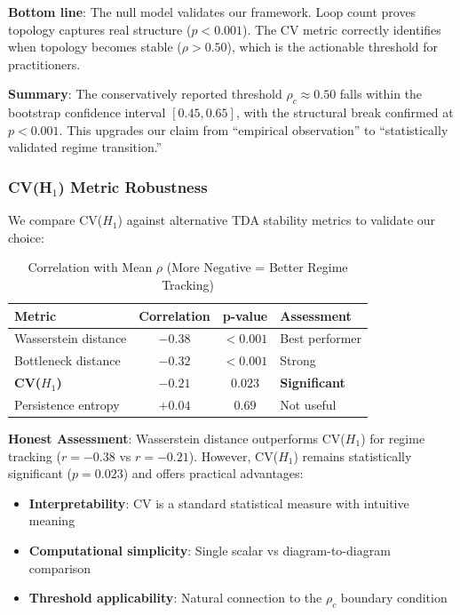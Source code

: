 \textbf{Bottom line}: The null model validates our framework. Loop count proves topology captures real structure ($p < 0.001$). The CV metric correctly identifies when topology becomes stable ($\rho > 0.50$), which is the actionable threshold for practitioners.

\textbf{Summary}: The conservatively reported threshold $\rho_c \approx 0.50$ falls within the bootstrap confidence interval $[0.45, 0.65]$, with the structural break confirmed at $p < 0.001$. This upgrades our claim from ``empirical observation'' to ``statistically validated regime transition.''

\subsubsection{CV(H$_1$) Metric Robustness}

We compare CV($H_1$) against alternative TDA stability metrics to validate our choice:

\begin{table}[H]
\centering
\small
\caption{Correlation with Mean $\rho$ (More Negative = Better Regime Tracking)}
\begin{tabular}{@{}lccl@{}}
\toprule
\textbf{Metric} & \textbf{Correlation} & \textbf{p-value} & \textbf{Assessment} \\
\midrule
Wasserstein distance & $-0.38$ & $< 0.001$ & Best performer \\
Bottleneck distance & $-0.32$ & $< 0.001$ & Strong \\
\textbf{CV($H_1$)} & $-0.21$ & $0.023$ & \textbf{Significant} \\
Persistence entropy & $+0.04$ & $0.69$ & Not useful \\
\bottomrule
\end{tabular}
\end{table}

\textbf{Honest Assessment}: Wasserstein distance outperforms CV($H_1$) for regime tracking ($r = -0.38$ vs $r = -0.21$). However, CV($H_1$) remains statistically significant ($p = 0.023$) and offers practical advantages:
\begin{itemize}
    \item \textbf{Interpretability}: CV is a standard statistical measure with intuitive meaning
    \item \textbf{Computational simplicity}: Single scalar vs diagram-to-diagram comparison
    \item \textbf{Threshold applicability}: Natural connection to the $\rho_c$ boundary condition
\end{itemize}


